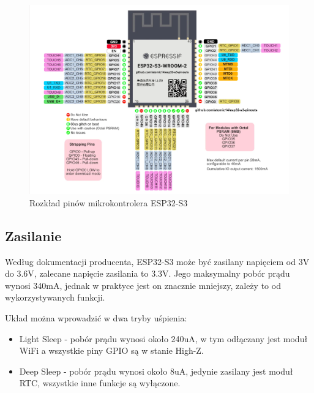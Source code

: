 \documentclass[../main.tex]{subfiles}
\begin{document}
\begin{figure}[H]
  \centering
  \includegraphics[width=1\textwidth]{Esp32.png}
  \caption{Rozkład pinów mikrokontrolera ESP32-S3\cite{st:esp32-pin}}
\end{figure}

\subsection{Zasilanie}
Według dokumentacji producenta, ESP32-S3 może być zasilany napięciem od 3V do 3.6V, zalecane napięcie zasilania to 3.3V.
Jego maksymalny pobór prądu wynosi 340mA, jednak w praktyce jest on znacznie mniejszy, zależy to od wykorzystywanych funkcji.

Układ można wprowadzić w dwa tryby uśpienia:
\begin{itemize}
\item Light Sleep - pobór prądu wynosi około 240uA, w tym odłączany jest moduł WiFi a wszystkie piny GPIO są w stanie High-Z.
\item Deep Sleep - pobór prądu wynosi około 8uA, jedynie zasilany jest moduł RTC, wszystkie inne funkcje są wyłączone.
\end{itemize}
\end{document}
